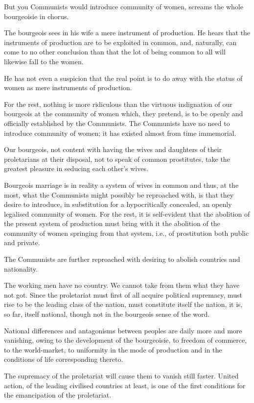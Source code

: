 \documentclass[, oneside]{article}   	%
\begin{document}
But you Communists would introduce community of women, screams the whole bourgeoisie in chorus.

The bourgeois sees in his wife a mere instrument of production. He hears that the instruments of production are to be exploited in common, and, naturally, can come to no other conclusion than that the lot of being common to all will likewise fall to the women.

He has not even a suspicion that the real point is to do away with the status of women as mere instruments of production.

For the rest, nothing is more ridiculous than the virtuous indignation of our bourgeois at the community of women which, they pretend, is to be openly and officially established by the Communists. The Communists have no need to introduce community of women; it has existed almost from time immemorial.

Our bourgeois, not content with having the wives and daughters of their proletarians at their disposal, not to speak of common prostitutes, take the greatest pleasure in seducing each other's wives.

Bourgeois marriage is in reality a system of wives in common and thus, at the most, what the Communists might possibly be reproached with, is that they desire to introduce, in substitution for a hypocritically concealed, an openly legalised community of women. For the rest, it is self-evident that the abolition of the present system of production must bring with it the abolition of the community of women springing from that system, i.e., of prostitution both public and private.

The Communists are further reproached with desiring to abolish countries and nationality.

The working men have no country. We cannot take from them what they have not got. Since the proletariat must first of all acquire political supremacy, must rise to be the leading class of the nation, must constitute itself the nation, it is, so far, itself national, though not in the bourgeois sense of the word.

National differences and antagonisms between peoples are daily more and more vanishing, owing to the development of the bourgeoisie, to freedom of commerce, to the world-market, to uniformity in the mode of production and in the conditions of life corresponding thereto.

The supremacy of the proletariat will cause them to vanish still faster. United action, of the leading civilised countries at least, is one of the first conditions for the emancipation of the proletariat.
\end{document}
